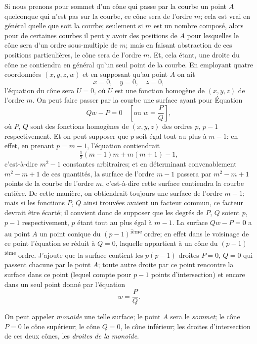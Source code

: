 \documentclass[11pt,a4paper]{article}
\begin{document}
Si nous prenons pour sommet d'un c\^{o}ne qui passe par la courbe un point $A$ quelconque qui n'est pas sur la courbe, ce c\^{o}ne sera de l'ordre $m$; cela est vrai en g\'{e}n\'{e}ral quelle que soit la courbe; seulement si $m$ est un nombre compos\'{e}, alors pour de certaines courbes il peut y avoir des positions de $A$ pour lesquelles le c\^{o}ne sera d'un ordre sous-multiple de $m$; mais en faisant abstraction de ces positions particuli\`{e}res, le c\^{o}ne sera de l'ordre $m$. Et, cela \'{e}tant, une droite du c\^{o}ne ne contiendra en g\'{e}n\'{e}ral qu'un seul point de la courbe. En employant quatre coordonn\'{e}es $(x, y, z, w)$ et en supposant qu'au point $A$ on ait
\[
x = 0, \quad y = 0, \quad z = 0,
\]
l'\'{e}quation du c\^{o}ne sera $U = 0$, o\`{u} $U$ est une fonction homog\`{e}ne de $(x, y, z)$ de l'ordre $m$. On peut faire passer par la courbe une surface ayant pour \'{E}quation
\[
Qw - P = 0 \quad \left[\text{ou } w = \frac{P}{Q}\right],
\]
o\`{u} $P$, $Q$ sont des fonctions homog\`{e}nes de $(x, y, z)$ des ordres $p$, $p-1$ respectivement. Et on peut supposer que $p$ soit \'{e}gal tout au plus \`{a} $m-1$: en effet, en prenant $p = m-1$, l'\'{e}quation contiendrait
\[
\tfrac{1}{2}(m-1)m + m(m+1) - 1,
\]
c'est-\`{a}-dire $m^2 - 1$ constantes arbitraires; et en d\'{e}terminant convenablement $m^2 - m + 1$ de ces quantit\'{e}s, la surface de l'ordre $m - 1$ passera par $m^2 - m + 1$ points de la courbe de l'ordre $m$, c'est-\`{a}-dire cette surface contiendra la courbe enti\`{e}re. De cette mani\`{e}re, on obtiendrait toujours une surface de l'ordre $m - 1$; mais si les fonctions $P$, $Q$ ainsi trouv\'{e}es avaient un facteur commun, ce facteur devrait \^{e}tre \'{e}cart\'{e}; il convient donc de supposer que les degr\'{e}s de $P$, $Q$ soient $p$, $p-1$ respectivement, $p$ \'{e}tant tout au plus \'{e}gal \`{a} $m-1$. La surface $Qw - P = 0$ a au point $A$ un point conique du $(p-1)$\textsuperscript{i\`{e}me} ordre; en effet dans le voisinage de ce point l'\'{e}quation se r\'{e}duit \`{a} $Q = 0$, laquelle appartient \`{a} un c\^{o}ne du $(p-1)$\textsuperscript{i\`{e}me} ordre. J'ajoute que la surface contient les $p(p-1)$ droites $P = 0$, $Q = 0$ qui passent chacune par le point $A$; toute autre droite par ce point rencontre la surface dans ce point (lequel compte pour $p-1$ points d'intersection) et encore dans un seul point donn\'{e} par l'\'{e}quation
\[
w = \frac{P}{Q}.
\]

On peut appeler \textit{mono\"{i}de} une telle surface; le point $A$ sera le \textit{sommet}; le c\^{o}ne $P = 0$ le c\^{o}ne sup\'{e}rieur; le c\^{o}ne $Q = 0$, le c\^{o}ne inf\'{e}rieur; les droites d'intersection de ces deux c\^{o}nes, les \textit{droites de la mono\"{i}de}.
\end{document}
